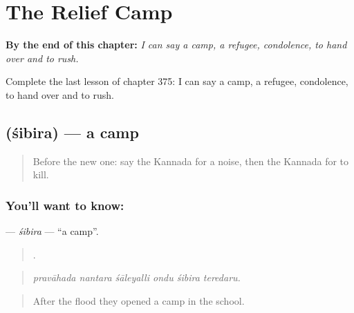 
\chapter{The Relief Camp}
\label{ch:ka-the-relief-camp}

\begin{chapteropening}
\textbf{By the end of this chapter:} \emph{I can say a camp, a refugee, condolence, to hand over and to rush.}

Complete the last lesson of chapter 375: I can say a camp, a refugee, condolence, to hand over and to rush.
\end{chapteropening}

\section[\texorpdfstring{\kn{ಶಿಬಿರ} (śibira)}{ಶಿಬಿರ (śibira)}]{ (śibira) — a camp}

\label{lesson:KA-C375-sibira}



\begin{quote}
Before the new one: say the Kannada for a noise, then the Kannada for to kill.
\end{quote}

\subsection*{You'll want to know: }
\textbf{} — \emph{śibira} — \textquotedblleft{}a camp\textquotedblright{}.

\begin{quote}
     .
\end{quote}

\begin{quote}
\emph{pravāhada nantara śāleyalli ondu śibira teredaru.}
\end{quote}

\begin{quote}
After the flood they opened a camp in the school.
\end{quote}

